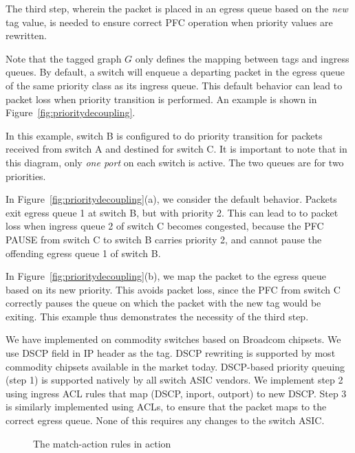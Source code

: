 The third step, wherein the packet is placed in an egress queue based on the
{\em new} tag value, is needed to ensure correct PFC operation when priority
values are rewritten.  

Note that the tagged graph $G$ only defines the mapping between tags and ingress
queues. By default, a switch will enqueue a departing packet in the egress queue
of the same priority class as its ingress queue. This default behavior can lead
to packet loss when priority transition is performed. An example is shown in
Figure~\ref{fig:prioritydecoupling}. 
 
In this example, switch B is configured to do priority transition for packets
received from switch A and destined for switch C. It is important to note that
in this diagram, only {\em one port} on each switch is active. The two queues
are for two priorities.
 
In Figure~\ref{fig:prioritydecoupling}(a), we consider the default behavior.
Packets exit egress queue 1 at switch B, but with priority 2.  This can lead to
to packet loss when ingress queue 2 of switch C becomes congested, because 
the PFC PAUSE from switch C to switch B carries priority 2, and cannot pause 
the offending egress queue 1 of switch B. 
 
In Figure~\ref{fig:prioritydecoupling}(b), we map the packet to the egress queue
based on its new priority.  This avoids packet loss, since the PFC from switch C
correctly pauses the queue on which the packet with the new tag would be
exiting. This example thus demonstrates the necessity of the third step.

We have implemented \sysname{} on commodity switches based on Broadcom chipsets.
We use DSCP field in IP header as the tag. DSCP rewriting is supported by most
commodity chipsets available in the market today. DSCP-based priority queuing
(step 1) is supported natively by all switch ASIC vendors. We implement step 2
using ingress ACL rules that map (DSCP, inport, outport) to new DSCP. Step 3 is
similarly implemented using ACLs, to ensure that the packet maps to the correct
egress queue. None of this requires any changes to the switch ASIC.

\begin{figure}[t]
	\centering
	
	
	\caption{The match-action rules in action}\label{fig:tagger_demon}
\end{figure}


